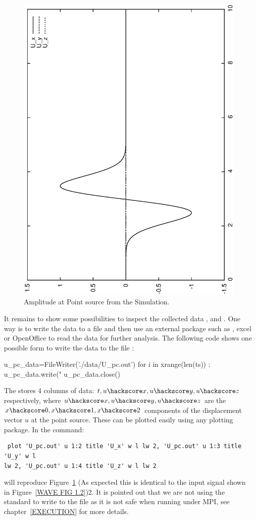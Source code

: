 \begin{figure}[t!]
\centerline{\includegraphics[width=4.in, angle=-90]{figures/WavePC}}
\caption{Amplitude at Point source from the Simulation.}
\label{WAVE FIG 1}
\end{figure}

It remains to show some possibilities to inspect the collected data ,  and .
One way is to write the data to a file and then use an external package such as \gnuplot, excel or OpenOffice to read the data for further analysis. The following code shows one possible form to write the data to the 
file :
\begin{python}
u_pc_data=FileWriter('./data/U_pc.out')
for i in xrange(len(ts)) :
    u_pc_data.write("%
u_pc_data.close()
\end{python}
The  stores 4 columns of data: $t,u\hackscore x,u\hackscore y,u\hackscore z$ 
respectively, where $u\hackscore x,u\hackscore y,u\hackscore z$ are the $x\hackscore 0,x\hackscore 1,x\hackscore 2$ components of the displacement vector $u$ at the point source. These can be
plotted easily using any plotting package. In \gnuplot the command:
\begin{verbatim}
 plot 'U_pc.out' u 1:2 title 'U_x' w l lw 2, 'U_pc.out' u 1:3 title 'U_y' w l 
lw 2, 'U_pc.out' u 1:4 title 'U_z' w l lw 2
\end{verbatim}
will reproduce Figure~\ref{WAVE FIG 1} (As expected this is identical to the input signal shown in Figure~\ref{WAVE FIG 1.2})2. It is pointed out that we are not using the
standard \PYTHON {} to write to the file  as it is not safe
when running \escript under MPI, see chapter~\ref{EXECUTION} for more details.

